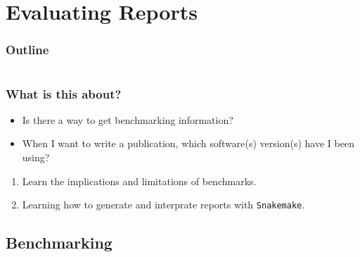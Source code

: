 \section{Evaluating Reports}

\begin{frame}
    \frametitle{Outline}
    \begin{columns}[t]
        \begin{column}{.5\textwidth}
            \tableofcontents[sections={1-9},currentsection]
        \end{column}
        \begin{column}{.5\textwidth}
            \tableofcontents[sections={10-18},currentsection]
        \end{column}
    \end{columns}
\end{frame}

\begin{frame}
  \frametitle{What is this about?}
   \begin{question}[Questions]
   	 \begin{itemize}
        \item Is there a way to get benchmarking information?
        \item When I want to write a publication, which software(s) version(s) have I been using?
     \end{itemize}
   \end{question}
   \begin{docs}[Objectives]
   	  \begin{enumerate}
         \item Learn the implications and limitations of benchmarks.
         \item Learning how to generate and interprate reports with \texttt{Snakemake}.
      \end{enumerate}
  \end{docs}
\end{frame}

\subsection{Benchmarking}

